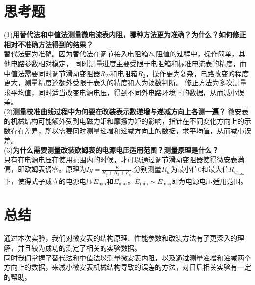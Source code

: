 \documentclass{article}
\begin{document}
\section{思考题}
(1)\textbf{用替代法和中值法测量微电流表内阻，哪种方法更为准确？为什么？如何修正相对不准确方法得到的结果？}\\
\hspace*{2em}替代法更为准确。因为替代法在调节接入电阻箱$R_2$阻值的过程中，操作简单，其他电路参数相对稳定，
同时测量进度主要受限于电阻箱和标准电流表的精度，而中值法需要同时调节滑动变阻器$R_W$和电阻箱$R_2$，操作更为复杂，电路改变的程度更大，测量精度还额外受限于表头的精度和人为读数判断。
\hspace*{2em}修正方法为多次测量求平均值，同时适当改变电源电压，得到不同外电路环境下的数据，从而减小误差。\\
(2)\textbf{测量校准曲线过程中为何要在改装表示数递增与递减方向上各测一遍？}
\hspace*{2em}微安表的机械结构可能额外受到电磁力矩和摩擦力矩的影响，指针在不同变化方向上的示数存在差异，所以需要同时测量递增和递减方向上的数据，求平均值，从而减小误差。\\
(3)\textbf{为什么需要测量改装欧姆表的电源电压适用范围？测量原理是什么？}\\
\hspace*{2em}只有在电源电压在使用范围内的时候，才可以通过调节滑动变阻器使得微安表满偏，即欧姆表调零。原理为$Ig=\frac{E}{R_g+R_3+R_w}$,分别测量$R_w$为最小值0和最大值$R_{w_{\max}}$下，使得式子成立的电源电压$E_{\min}$和$E_{\max}$。$E_{\min}\sim E_{\max}$即为电源电压适用范围。
\section{总结}
\hspace*{2em}通过本次实验，我们对微安表的结构原理、性能参数和改装方法有了更深入的理解，并且较为成功的测定了相关的实验数据。\\
\hspace*{2em}同时我们掌握了替代法和中值法以测量微安表内阻，以及通过测量递增和递减两个方向上的数据，来减小微安表机械结构导致的误差的方法，对日后相关实验有一定的帮助。
\end{document}
